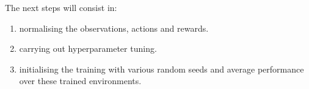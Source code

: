 \documentclass{article}
\begin{document}
The next steps will consist in:
\begin{enumerate}
	\item normalising the observations, actions and rewards.
	\item carrying out hyperparameter tuning.
	\item initialising the training with various random seeds and average performance over these trained environments.
\end{enumerate}
 
\end{document}
